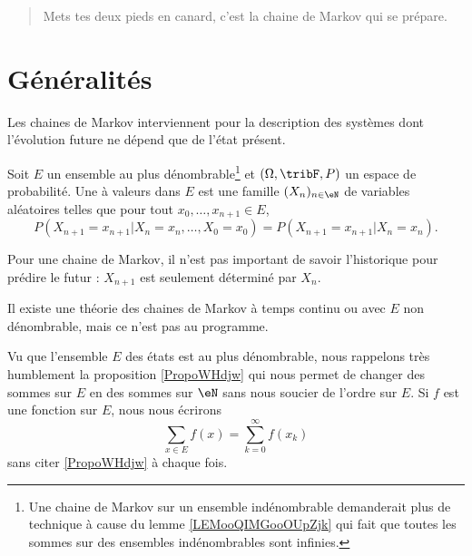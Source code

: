 
\begin{quote}
	Mets tes deux pieds en canard, c'est la chaine de Markov qui se prépare.
\end{quote}

\section{Généralités}

Les chaines de Markov interviennent pour la description des systèmes dont l'évolution future ne dépend que de l'état présent.

\begin{definition}      \label{DEFooGDPFooWsvfRv}
	Soit \( E\) un ensemble au plus dénombrable\footnote{Une chaine de Markov sur un ensemble indénombrable demanderait plus de technique à cause du lemme \ref{LEMooQIMGooOUpZjk} qui fait que toutes les sommes sur des ensembles indénombrables sont infinies.} et \( (\Omega,\tribF,P)\) un espace de probabilité. Une  à valeurs dans \( E\) est une famille \( (X_n)_{n\in\eN}\) de variables aléatoires telles que pour tout \( x_0,\ldots,x_{n+1}\in E\),
	\begin{equation}
		P(X_{n+1}=x_{n+1}|X_n=x_n,\ldots,X_0=x_0)=P(X_{n+1}=x_{n+1}|X_n=x_n).
	\end{equation}
\end{definition}
Pour une chaine de Markov, il n'est pas important de savoir l'historique pour prédire le futur : \( X_{n+1}\) est seulement déterminé par \( X_n\).

\begin{remark}
	Il existe une théorie des chaines de Markov à temps continu ou avec \( E\) non dénombrable, mais ce n'est pas au programme.
\end{remark}

\begin{normaltext}
	Vu que l'ensemble \( E\) des états est au plus dénombrable, nous rappelons très humblement  la proposition \ref{PropoWHdjw} qui nous permet de changer des sommes sur \( E\) en des sommes sur \( \eN\) sans nous soucier de l'ordre sur \( E\). Si \( f\) est une fonction sur \( E\), nous nous écrirons
	\begin{equation}
		\sum_{x\in E}f(x)=\sum_{k=0}^{\infty}f(x_k)
	\end{equation}
	sans citer \ref{PropoWHdjw} à chaque fois.
\end{normaltext}

